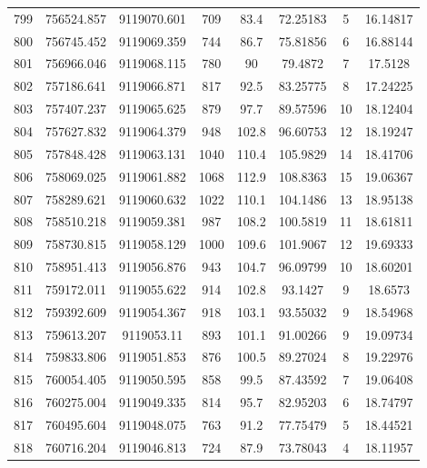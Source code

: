 \begin{longtable}{cccccccc}
799  & 756524.857      & 9119070.601      & 709     & 83.4  & 72.25183 & 5  & 16.14817 \\
800  & 756745.452      & 9119069.359      & 744     & 86.7  & 75.81856 & 6  & 16.88144 \\
801  & 756966.046      & 9119068.115      & 780     & 90    & 79.4872  & 7  & 17.5128  \\
802  & 757186.641      & 9119066.871      & 817     & 92.5  & 83.25775 & 8  & 17.24225 \\
803  & 757407.237      & 9119065.625      & 879     & 97.7  & 89.57596 & 10 & 18.12404 \\
804  & 757627.832      & 9119064.379      & 948     & 102.8 & 96.60753 & 12 & 18.19247 \\
805  & 757848.428      & 9119063.131      & 1040    & 110.4 & 105.9829 & 14 & 18.41706 \\
806  & 758069.025      & 9119061.882      & 1068    & 112.9 & 108.8363 & 15 & 19.06367 \\
807  & 758289.621      & 9119060.632      & 1022    & 110.1 & 104.1486 & 13 & 18.95138 \\
808  & 758510.218      & 9119059.381      & 987     & 108.2 & 100.5819 & 11 & 18.61811 \\
809  & 758730.815      & 9119058.129      & 1000    & 109.6 & 101.9067 & 12 & 19.69333 \\
810  & 758951.413      & 9119056.876      & 943     & 104.7 & 96.09799 & 10 & 18.60201 \\
811  & 759172.011      & 9119055.622      & 914     & 102.8 & 93.1427  & 9  & 18.6573  \\
812  & 759392.609      & 9119054.367      & 918     & 103.1 & 93.55032 & 9  & 18.54968 \\
813  & 759613.207      & 9119053.11       & 893     & 101.1 & 91.00266 & 9  & 19.09734 \\
814  & 759833.806      & 9119051.853      & 876     & 100.5 & 89.27024 & 8  & 19.22976 \\
815  & 760054.405      & 9119050.595      & 858     & 99.5  & 87.43592 & 7  & 19.06408 \\
816  & 760275.004      & 9119049.335      & 814     & 95.7  & 82.95203 & 6  & 18.74797 \\
817  & 760495.604      & 9119048.075      & 763     & 91.2  & 77.75479 & 5  & 18.44521 \\
818  & 760716.204      & 9119046.813      & 724     & 87.9  & 73.78043 & 4  & 18.11957 \\

\end{longtable}
